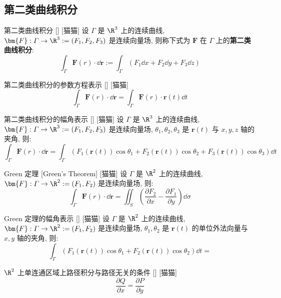 \documentclass[UTF8]{ctexart}
\begin{document}
		\subsection{第二类曲线积分}

			\begin{dfn}
				[]
				{第二类曲线积分}
				[]
				[猫猫]
				设 \(\varGamma\) 是 \(\R^3\) 上的连续曲线, \(\bm{F}:\varGamma\to\R^3:=(F_1,F_2,F_3)\) 是连续向量场, 则称下式为 \(\bm{F}\) 在 \(\varGamma\) 上的\textbf{第二类曲线积分}: 
				\[\int_\varGamma\bm{F}(r)\cdot\dd\bm{r}:=\int_\varGamma(F_1\dd x+F_2\dd y+F_3\dd z)\]
			\end{dfn}
			
			\begin{ppt}
				[]
				{第二类曲线积分的参数方程表示}
				[]
				[猫猫]
				\[\int_\varGamma\bm{F}(r)\cdot\dd\bm{r}=\int_\varGamma\bm{F}(r)\cdot\bm{r}(t)\dd t\]
			\end{ppt}
			
			\begin{ppt}
				[]
				{第二类曲线积分的幅角表示}
				[]
				[猫猫]
				设 \(\varGamma\) 是 \(\R^3\) 上的连续曲线, \(\bm{F}:\varGamma\to\R^3:=(F_1,F_2,F_3)\) 是连续向量场, \(\theta_1, \theta_2, \theta_3\) 是 \(\bm{r}(t)\) 与 \(x,y,z\) 轴的夹角, 则: 
				\[\int_\varGamma\bm{F}(r)\cdot\dd\bm{r}=\int_\varGamma(F_1(\bm{r}(t))\cos\theta_1+F_2(\bm{r}(t))\cos\theta_2+F_3(\bm{r}(t))\cos\theta_3)\dd t\]
			\end{ppt}
			
			\begin{thm}
				[]
				{Green 定理}
				[Green's Theorem]
				[猫猫]
				设 \(\varGamma\) 是 \(\R^2\) 上的连续曲线, \(\bm{F}:\varGamma\to\R^2:=(F_1,F_2)\) 是连续向量场, 则: 
				\[\int_\varGamma\bm{F}(r)\cdot\dd\bm{r}=\iint_S\left(\frac{\partial F_2}{\partial x}-\frac{\partial F_1}{\partial y}\right)\dd\sigma\]
			\end{thm}
			
			\begin{crl}
				[]
				{Green 定理的幅角表示}
				[]
				[猫猫]
				设 \(\varGamma\) 是 \(\R^2\) 上的连续曲线, \(\bm{F}:\varGamma\to\R^2:=(F_1,F_2)\) 是连续向量场, \(\theta_1, \theta_2\) 是 \(\bm{r}(t)\) 的单位外法向量与 \(x,y\) 轴的夹角, 则: 
				\[\int_{\varGamma}(F_1(\bm{r}(t))\cos\theta_1+F_2(\bm{r}(t))\cos\theta_2)\dd t=\]
			\end{crl}
			
			\begin{thm}
				[]
				{\(\R^2\) 上单连通区域上路径积分与路径无关的条件}
				[]
				[猫猫]
				\[\frac{\partial Q}{\partial x}=\frac{\partial P}{\partial y}\]
			\end{thm}
\end{document}
